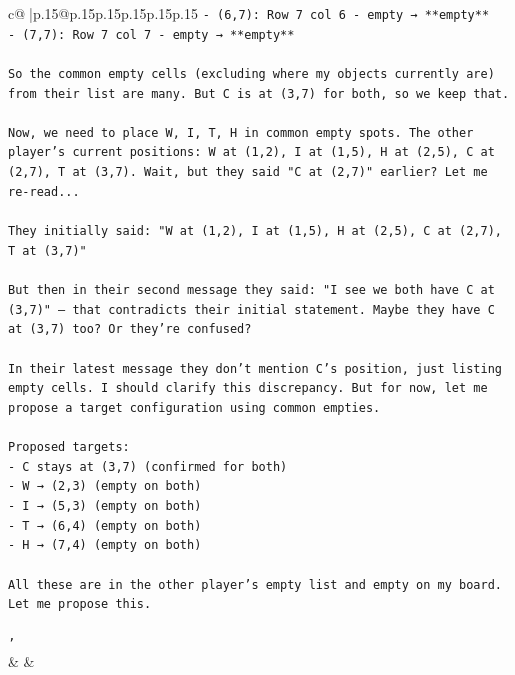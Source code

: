 \documentclass{article}
\begin{document}
{\begin{supertabular}{c@{$\;$}|p{.15\linewidth}@{}p{.15\linewidth}p{.15\linewidth}p{.15\linewidth}p{.15\linewidth}p{.15\linewidth}}
{{{\texttt{{-} (6,7): Row 7 col 6 {-} empty → **empty**} \\
\texttt{{-} (7,7): Row 7 col 7 {-} empty → **empty**} \\
\\ 
\texttt{So the common empty cells (excluding where my objects currently are) from their list are many. But C is at (3,7) for both, so we keep that.} \\
\\ 
\texttt{Now, we need to place W, I, T, H in common empty spots. The other player's current positions: W at (1,2), I at (1,5), H at (2,5), C at (2,7), T at (3,7). Wait, but they said "C at (2,7)" earlier? Let me re{-}read...} \\
\\ 
\texttt{They initially said: "W at (1,2), I at (1,5), H at (2,5), C at (2,7), T at (3,7)"} \\
\\ 
\texttt{But then in their second message they said: "I see we both have C at (3,7)" — that contradicts their initial statement. Maybe they have C at (3,7) too? Or they're confused?} \\
\\ 
\texttt{In their latest message they don't mention C's position, just listing empty cells. I should clarify this discrepancy. But for now, let me propose a target configuration using common empties.} \\
\\ 
\texttt{Proposed targets:} \\
\texttt{{-} C stays at (3,7) (confirmed for both)} \\
\texttt{{-} W → (2,3) (empty on both)} \\
\texttt{{-} I → (5,3) (empty on both)} \\
\texttt{{-} T → (6,4) (empty on both)} \\
\texttt{{-} H → (7,4) (empty on both)} \\
\\ 
\texttt{All these are in the other player's empty list and empty on my board. Let me propose this.} \\
\\ 
\texttt{'} \\
            }
        }
    }
    & & \\ \\


\end{supertabular}}
\end{document}
